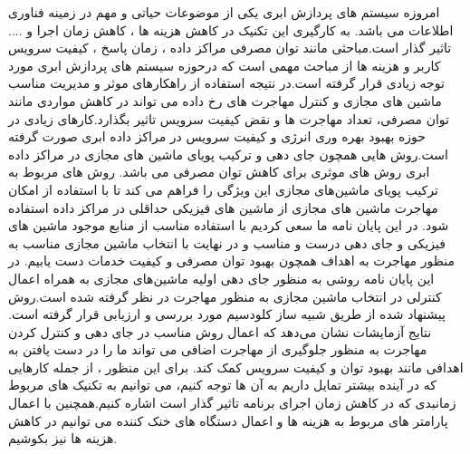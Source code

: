 امروزه سیستم های پردازش ابری یکی از موضوعات حیاتی و مهم در زمینه فناوری اطلاعات می باشد. به کارگیری این تکنیک در کاهش هزینه ها ، کاهش زمان اجرا و .... تاثیر گذار است.مباحثی مانند توان مصرفی مراکز داده ، زمان پاسخ ، کیفیت سرویس کاربر و هزینه  ها از مباحث مهمی است که درحوزه سیستم های پردازش ابری مورد توجه زیادی قرار گرفته است.در نتیجه استفاده از راهکارهای موثر و مدیریت مناسب ماشین های مجازی و کنترل مهاجرت های رخ داده می تواند در کاهش مواردی مانند توان مصرفی، تعداد مهاجرت ها و نقض کیفیت سرویس تاثیر بگذارد.کارهای زیادی در حوزه  بهبود بهره وری انرژی و کیفیت سرویس در مراکز داده ابری صورت گرفته است.روش هایی همچون جای دهی و ترکیب پویای ماشین های مجازی در مراکز داده ابری روش های موثری برای کاهش توان مصرفی می باشد. روش های مربوط به ترکیب پویای ماشین‌های مجازی این ویژگی را فراهم می کند تا با استفاده از امکان مهاجرت ماشین های مجازی از ماشین های فیزیکی حداقلی در مراکز داده استفاده شود. 
در این پایان نامه ما سعی کردیم با  استفاده مناسب از منابع موجود ماشین های فیزیکی و جای دهی درست و مناسب و در نهایت با انتخاب ماشین مجازی مناسب به منظور مهاجرت به اهداف همچون بهبود توان مصرفی و کیفیت خدمات دست یابیم. 
در این پایان نامه روشی به منظور جای دهی اولیه ماشین‌های مجازی به همراه اعمال کنترلی در انتخاب ماشین مجازی به منظور مهاجرت در نظر گرفته شده است.روش پیشنهاد شده از طریق شبیه ساز کلودسیم مورد بررسی و ارزیابی قرار گرفته است. نتایج آزمایشات نشان می‌دهد که اعمال روش مناسب در جای دهی و کنترل کردن مهاجرت به منظور جلوگیری از مهاجرت اضافی  می تواند ما را در دست یافتن به اهدافی مانند بهبود توان و کیفیت سرویس کمک کند.
برای این منظور ، از جمله کارهایی  که در آینده بیشتر  تمایل داریم به آن ها توجه کنیم، می توانیم به تکنیک های مربوط زمانبدی که در کاهش زمان اجرای برنامه تاثیر گذار است اشاره کنیم.همچنین با اعمال پارامتر های مربوط به هزینه ها و اعمال دستگاه های خنک کننده می توانیم در کاهش هزینه ها نیز بکوشیم. 